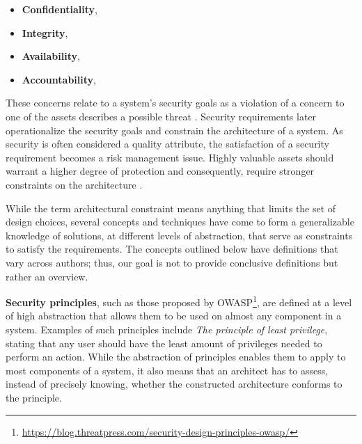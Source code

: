 \begin{itemize}
    \item \textbf{Confidentiality},  \cite{ross_systems_2018}
    \item \textbf{Integrity},  \cite{ross_systems_2018}
    \item \textbf{Availability},  \cite{ross_systems_2018}
    \item \textbf{Accountability},  \cite{ross_systems_2018}
\end{itemize}

These concerns relate to a system's security goals as a violation of a concern to one of the assets describes a possible threat \cite{haley_security_2008}. Security requirements later operationalize the security goals and constrain the architecture of a system. As security is often considered a quality attribute, the satisfaction of a security requirement becomes a risk management issue.  Highly valuable assets should warrant a higher degree of protection and consequently, require stronger constraints on the architecture \cite{broy_software_2007}.

While the term architectural constraint means anything that limits the set of design choices, several concepts and techniques have come to form a generalizable knowledge of solutions, at different levels of abstraction, that serve as constraints to satisfy the requirements. The concepts outlined below have definitions that vary across authors; thus, our goal is not to provide conclusive definitions but rather an overview. 

\textbf{Security principles}, such as those proposed by OWASP\footnote{\url{https://blog.threatpress.com/security-design-principles-owasp/}}, are defined at a level of high abstraction that allows them to be used on almost any component in a system. Examples of such principles include \textit{The principle of least privilege}, stating that any user should have the least amount of privileges needed to perform an action. While the abstraction of principles enables them to apply to most components of a system, it also means that an architect has to assess, instead of precisely knowing, whether the constructed architecture conforms to the principle. 

